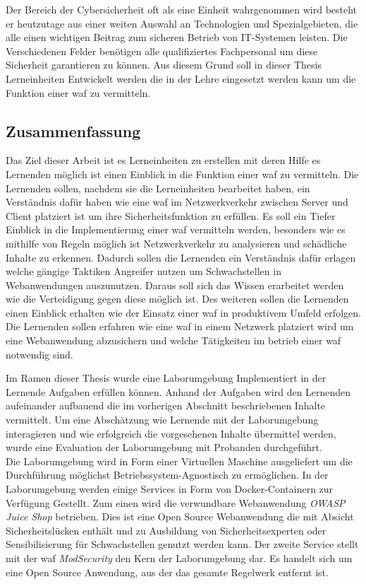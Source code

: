 Der Bereich der Cybersicherheit oft als eine Einheit wahrgenommen wird besteht er heutzutage aus einer weiten Auswahl an Technologien und Spezialgebieten, die alle einen wichtigen Beitrag zum sicheren Betrieb von IT-Systemen leisten.
Die Verschiedenen Felder benötigen alle qualifiziertes Fachpersonal um diese Sicherheit garantieren zu können.
Aus diesem Grund soll in dieser Thesis Lerneinheiten Entwickelt werden die in der Lehre eingesetzt werden kann um die Funktion einer \ac{waf} zu vermitteln.

\subsection{Zusammenfassung}
Das Ziel dieser Arbeit ist es Lerneinheiten zu erstellen mit deren Hilfe es Lernenden möglich ist einen Einblick in die Funktion einer \ac{waf} zu vermitteln.
Die Lernenden sollen, nachdem sie die Lerneinheiten bearbeitet haben, ein Verständnis dafür haben wie eine \ac{waf} im Netzwerkverkehr zwischen Server und Client platziert ist um ihre Sicherheitsfunktion zu erfüllen.
Es soll ein Tiefer Einblick in die Implementierung einer \ac{waf} vermitteln werden, besonders wie es mithilfe von Regeln möglich ist Netzwerkverkehr zu analysieren und schädliche Inhalte zu erkennen.
Dadurch sollen die Lernenden ein Verständnis dafür erlagen welche gängige Taktiken Angreifer nutzen um Schwachstellen in Webanwendungen auszunutzen.
Daraus soll sich das Wissen erarbeitet werden wie die Verteidigung gegen diese möglich ist.
Des weiteren sollen die Lernenden einen Einblick erhalten wie der Einsatz einer \ac{waf} in produktivem Umfeld erfolgen.
Die Lernenden sollen erfahren wie eine \ac{waf} in einem Netzwerk platziert wird um eine Webanwendung abzusichern und welche Tätigkeiten im betrieb einer \ac{waf} notwendig sind.

Im Ramen dieser Thesis wurde eine Laborumgebung Implementiert in der Lernende Aufgaben erfüllen können.
Anhand der Aufgaben wird den Lernenden aufeinander aufbauend die im vorherigen Abschnitt beschriebenen Inhalte vermittelt.
Um eine Abschätzung wie Lernende mit der Laborumgebung interagieren und wie erfolgreich die vorgesehenen Inhalte übermittel werden, wurde eine Evaluation der Laborumgebung mit Probanden durchgeführt.\\

Die Laborumgebung wird in Form einer Virtuellen Maschine ausgeliefert um die Durchführung möglichst Betriebssystem-Agnostisch zu ermöglichen.
In der Laborumgebung werden einige Services in Form von Docker-Containern zur Verfügung Gestellt.
Zum einen wird die verwundbare Webanwendung \textit{OWASP Juice Shop} betrieben.
Dies ist eine Open Source Webanwendung die mit Absicht Sicherheitslücken enthält und zu Ausbildung von Sicherheitsexperten oder Sensibilisierung für Schwachstellen genutzt werden kann.
Der zweite Service stellt mit der \ac{waf} \textit{ModSecurity} den Kern der Laborumgebung dar.
Es handelt sich um eine Open Source Anwendung, aus der das gesamte Regelwerk entfernt ist.\\

